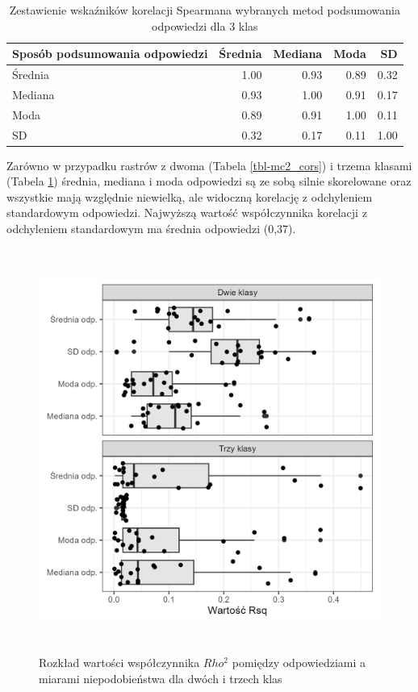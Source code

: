 \documentclass{amuthesis}
\begin{document}
\hypertarget{tbl-mc3_cors}{}
\begin{table}
\caption{\label{tbl-mc3_cors}Zestawienie wskaźników korelacji Spearmana wybranych metod podsumowania
odpowiedzi dla 3 klas }\tabularnewline

\centering
\begin{tabular}{lrrrr}
\toprule
Sposób podsumowania
odpowiedzi & Średnia & Mediana & Moda & SD\\
\midrule
Średnia & 1.00 & 0.93 & 0.89 & 0.32\\
Mediana & 0.93 & 1.00 & 0.91 & 0.17\\
Moda & 0.89 & 0.91 & 1.00 & 0.11\\
SD & 0.32 & 0.17 & 0.11 & 1.00\\
\bottomrule
\end{tabular}
\end{table}

Zarówno w przypadku rastrów z dwoma (Tabela \ref{tbl-mc2_cors}) i trzema
klasami (Tabela \ref{tbl-mc3_cors}) średnia, mediana i moda odpowiedzi
są ze sobą silnie skorelowane oraz wszystkie mają względnie niewielką,
ale widoczną korelację z odchyleniem standardowym odpowiedzi. Najwyższą
wartość współczynnika korelacji z odchyleniem standardowym ma średnia
odpowiedzi (0,37).

\begin{figure}[t]

{\centering \includegraphics[width=5.20833in,height=5.20833in]{figures/rsq_vs_metody_agregacji_odp.png}

}

\caption{\label{fig-rsq_vs_metody_agregacji_odp}Rozkład wartości
współczynnika \(Rho^2\) pomiędzy odpowiedziami a miarami niepodobieństwa
dla dwóch i trzech klas}

\end{figure}
\end{document}
